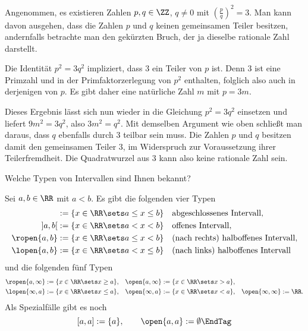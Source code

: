 \begin{antwort}
  Angenommen, es existieren Zahlen $p,q \in \ZZ$, $q\not=0$  mit 
  $\left(\frac{p}{q}\right)^2 =3$. 
  Man kann davon ausgehen, dass die Zahlen $p$ und $q$ keinen gemeinsamen 
  Teiler besitzen, andernfalls betrachte man den gekürzten Bruch, der ja 
  dieselbe rationale Zahl darstellt. 

  Die Identität $p^2=3q^2$ impliziert, 
  dass $3$ ein Teiler von $p$ ist. Denn $3$ ist eine Primzahl und 
  in der Primfaktorzerlegung von $p^2$ enthalten, folglich also auch in 
  derjenigen 
  von $p$. Es gibt daher eine natürliche Zahl $m$ mit $p=3m$. 

  Dieses Ergebnis lässt sich nun wieder in die Gleichung 
  $p^2=3q^2$ einsetzen und liefert $9m^2=3q^2$, also $3m^2=q^2$. 
  Mit demselben Argument wie oben schließt man daraus, dass $q$ 
  ebenfalls durch $3$ teilbar sein muss.
  Die Zahlen $p$ und $q$ besitzen damit den gemeinsamen Teiler 
  $3$, im Widerspruch zur Voraussetzung ihrer Teilerfremdheit. Die 
  Quadratwurzel aus $3$ kann also keine rationale Zahl sein.
  \AntEnd
\end{antwort}


\begin{frage}
  Welche Typen von Intervallen sind Ihnen bekannt?
\end{frage}

\begin{antwort}
  Sei $a,b\in\RR$ mit $a<b$. Es gibt die folgenden vier Typen 
  \begin{align*}
    [a,b] &:= \{ x\in\RR \sets a\le x\le b \} 
    & &\text{abgeschlossenes Intervall}, \\
    ] a,b [ &:= \{ x\in\RR \sets a < x < b \} 
    & &\text{offenes Intervall}, \\
    \ropen{ a,b } &:= \{ x\in\RR \sets a \le x < b \} 
    & &\text{(nach rechts) halboffenes Intervall}, \\
    \lopen{ a,b } &:= \{ x\in\RR \sets a < x \le b \} 
    & &\text{(nach links) halboffenes Intervall} 
  \end{align*}
  und die folgenden fünf Typen 
  \begin{align*}
    \ropen{a,\infty} &:= \{ x\in\RR\sets x\ge a \}, 
    &\open{a,\infty} &:= \{ x\in\RR\sets x > a \}, 
    &                & 
    \\
    \lopen{\infty, a} &:= \{ x\in\RR\sets x\le a \}, 
    &\open{\infty, a} &:= \{ x\in\RR\sets x < a \}, 
    &\open{\infty, \infty} &:= \RR. 
  \end{align*}
  Als Spezialfälle  gibt es noch 
  \[
  [a,a] := \{ a \}, \qquad
  \open{a,a} := \emptyset \EndTag
  \]
\end{antwort} 


